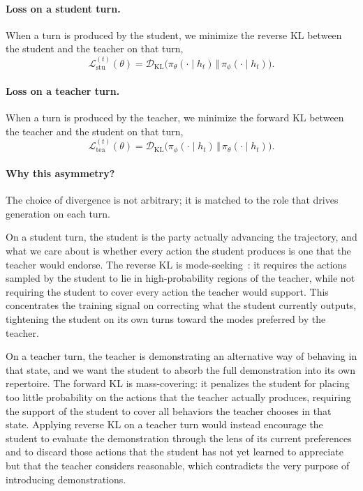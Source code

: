 \documentclass[11pt]{article}
\begin{document}
\paragraph{Loss on a student turn.}
When a turn is produced by the student, we minimize the reverse KL between the student and the teacher on that turn,
\begin{equation}
    \mathcal{L}_{\text{stu}}^{(t)}(\theta)
    = \mathcal{D}_{\mathrm{KL}}\!\big(\pi_\theta(\cdot \mid h_t) \,\Vert\, \pi_\phi(\cdot \mid h_t)\big).
    \label{eq:student-loss}
\end{equation}

\paragraph{Loss on a teacher turn.}
When a turn is produced by the teacher, we minimize the forward KL between the teacher and the student on that turn,
\begin{equation}
    \mathcal{L}_{\text{tea}}^{(t)}(\theta)
    = \mathcal{D}_{\mathrm{KL}}\!\big(\pi_\phi(\cdot \mid h_t) \,\Vert\, \pi_\theta(\cdot \mid h_t)\big).
    \label{eq:teacher-loss}
\end{equation}

\paragraph{Why this asymmetry?}
The choice of divergence is not arbitrary; it is matched to the role that drives generation on each turn.

On a student turn, the student is the party actually advancing the trajectory, and what we care about is whether every action the student produces is one that the teacher would endorse. The reverse KL is mode-seeking~\citep{opd, opdsurvey}: it requires the actions sampled by the student to lie in high-probability regions of the teacher, while not requiring the student to cover every action the teacher would support. This concentrates the training signal on correcting what the student currently outputs, tightening the student on its own turns toward the modes preferred by the teacher.

On a teacher turn, the teacher is demonstrating an alternative way of behaving in that state, and we want the student to absorb the full demonstration into its own repertoire. The forward KL is mass-covering: it penalizes the student for placing too little probability on the actions that the teacher actually produces, requiring the support of the student to cover all behaviors the teacher chooses in that state. Applying reverse KL on a teacher turn would instead encourage the student to evaluate the demonstration through the lens of its current preferences and to discard those actions that the student has not yet learned to appreciate but that the teacher considers reasonable, which contradicts the very purpose of introducing demonstrations.
\end{document}

